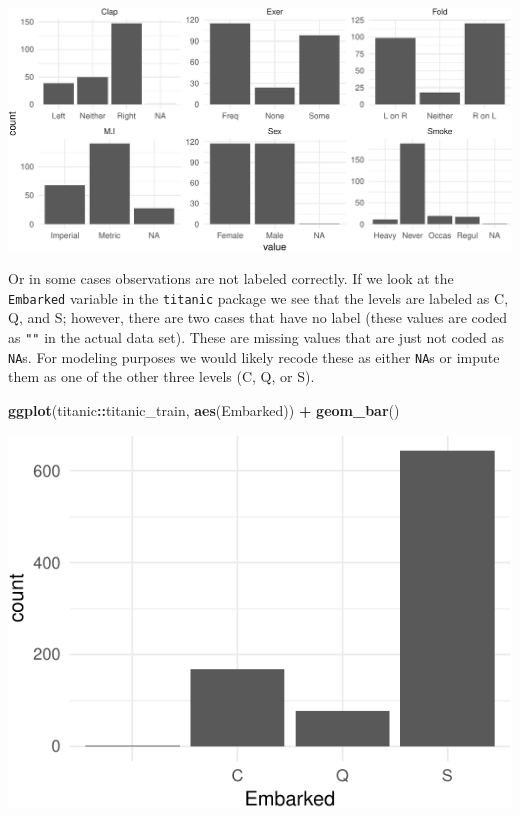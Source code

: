 \documentclass[]{article}
\newenvironment{Shaded}{\begin{snugshade}}{\end{snugshade}}
\newcommand{\KeywordTok}[1]{\textcolor[rgb]{0.13,0.29,0.53}{\textbf{#1}}}
\newcommand{\StringTok}[1]{\textcolor[rgb]{0.31,0.60,0.02}{#1}}
\newcommand{\OperatorTok}[1]{\textcolor[rgb]{0.81,0.36,0.00}{\textbf{#1}}}
\newcommand{\NormalTok}[1]{#1}
\begin{document}
\begin{center}\includegraphics{Chapter_3_-_Visualization_files/figure-latex/missing1-1} \end{center}

Or in some cases observations are not labeled correctly. If we look at
the \texttt{Embarked} variable in the \texttt{titanic} package we see
that the levels are labeled as C, Q, and S; however, there are two cases
that have no label (these values are coded as \texttt{""} in the actual
data set). These are missing values that are just not coded as
\texttt{NA}s. For modeling purposes we would likely recode these as
either \texttt{NA}s or impute them as one of the other three levels (C,
Q, or S).

\begin{Shaded}
\begin{Highlighting}[]
\KeywordTok{ggplot}\NormalTok{(titanic}\OperatorTok{::}\NormalTok{titanic_train, }\KeywordTok{aes}\NormalTok{(Embarked)) }\OperatorTok{+}
\StringTok{  }\KeywordTok{geom_bar}\NormalTok{()}
\end{Highlighting}
\end{Shaded}

\begin{center}\includegraphics{Chapter_3_-_Visualization_files/figure-latex/mislabeled-1} \end{center}
\end{document}
